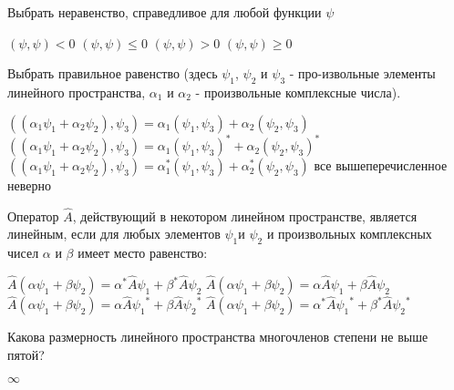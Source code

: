 \documentclass[11pt,a4paper]{exam}
\begin{document}
\begin{questions}
\question Выбрать неравенство, справедливое для любой функции $\psi $ 
\begin{choices}
\choice $\left( \psi ,\psi  \right)<0$     
\choice $\left( \psi ,\psi  \right)\le 0$          
\choice $\left( \psi ,\psi  \right)>0$    
\choice $\left( \psi ,\psi  \right)\ge 0$
\end{choices}

\question Выбрать правильное равенство (здесь ${{\psi }_{1}}$, ${{\psi }_{2}}$ и ${{\psi }_{3}}$ - про-извольные элементы линейного пространства, ${{\alpha }_{1}}$ и ${{\alpha }_{2}}$ - произвольные комплексные числа).
\begin{choices}
\choice $\left( ({{\alpha }_{1}}{{\psi }_{1}}+{{\alpha }_{2}}{{\psi }_{2}}),{{\psi }_{3}} \right)={{\alpha }_{1}}\left( {{\psi }_{1}},{{\psi }_{3}} \right)+{{\alpha }_{2}}\left( {{\psi }_{2}},{{\psi }_{3}} \right)$
\choice $\left( ({{\alpha }_{1}}{{\psi }_{1}}+{{\alpha }_{2}}{{\psi }_{2}}),{{\psi }_{3}} \right)={{\alpha }_{1}}{{\left( {{\psi }_{1}},{{\psi }_{3}} \right)}^{*}}+{{\alpha }_{2}}{{\left( {{\psi }_{2}},{{\psi }_{3}} \right)}^{*}}$
\choice $\left( ({{\alpha }_{1}}{{\psi }_{1}}+{{\alpha }_{2}}{{\psi }_{2}}),{{\psi }_{3}} \right)=\alpha _{1}^{*}\left( {{\psi }_{1}},{{\psi }_{3}} \right)+\alpha _{2}^{*}\left( {{\psi }_{2}},{{\psi }_{3}} \right)$
\choice все вышеперечисленное неверно
\end{choices}

\question Оператор $\hat{A}$, действующий в некотором линейном пространстве, является линейным, если для любых элементов ${{\psi }_{1}}$и ${{\psi }_{2}}$ и произвольных комплексных чисел $\alpha $ и $\beta $ имеет место равенство:
\begin{choices}
\choice $\hat{A}\left( \alpha {{\psi }_{1}}+\beta {{\psi }_{2}} \right)={{\alpha }^{*}}\hat{A}{{\psi }_{1}}+{{\beta }^{*}}\hat{A}{{\psi }_{2}}$    
\choice $\hat{A}\left( \alpha {{\psi }_{1}}+\beta {{\psi }_{2}} \right)=\alpha \hat{A}{{\psi }_{1}}+\beta \hat{A}{{\psi }_{2}}$
\choice $\hat{A}\left( \alpha {{\psi }_{1}}+\beta {{\psi }_{2}} \right)=\alpha \hat{A}{{\psi }_{1}}^{*}+\beta \hat{A}{{\psi }_{2}}^{*}$      
\choice $\hat{A}\left( \alpha {{\psi }_{1}}+\beta {{\psi }_{2}} \right)={{\alpha }^{*}}\hat{A}{{\psi }_{1}}^{*}+{{\beta }^{*}}\hat{A}{{\psi }_{2}}^{*}$
\end{choices}

\question Какова размерность линейного пространства многочленов степени не выше пятой?
\begin{choices}
\choice $\infty $
\end{choices}


\end{questions}
\end{document}
